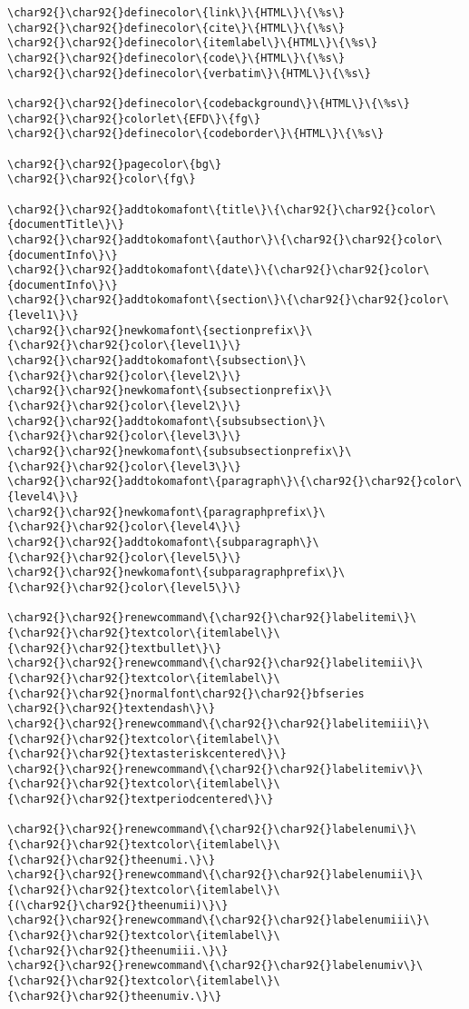 \documentclass{scrartcl}
\begin{document}
\begin{enumerate}
\begin{Code}
\begin{Verbatim}[]
\char92{}\char92{}definecolor\{link\}\{HTML\}\{\%s\}
\char92{}\char92{}definecolor\{cite\}\{HTML\}\{\%s\}
\char92{}\char92{}definecolor\{itemlabel\}\{HTML\}\{\%s\}
\char92{}\char92{}definecolor\{code\}\{HTML\}\{\%s\}
\char92{}\char92{}definecolor\{verbatim\}\{HTML\}\{\%s\}

\char92{}\char92{}definecolor\{codebackground\}\{HTML\}\{\%s\}
\char92{}\char92{}colorlet\{EFD\}\{fg\}
\char92{}\char92{}definecolor\{codeborder\}\{HTML\}\{\%s\}

\char92{}\char92{}pagecolor\{bg\}
\char92{}\char92{}color\{fg\}

\char92{}\char92{}addtokomafont\{title\}\{\char92{}\char92{}color\{documentTitle\}\}
\char92{}\char92{}addtokomafont\{author\}\{\char92{}\char92{}color\{documentInfo\}\}
\char92{}\char92{}addtokomafont\{date\}\{\char92{}\char92{}color\{documentInfo\}\}
\char92{}\char92{}addtokomafont\{section\}\{\char92{}\char92{}color\{level1\}\}
\char92{}\char92{}newkomafont\{sectionprefix\}\{\char92{}\char92{}color\{level1\}\}
\char92{}\char92{}addtokomafont\{subsection\}\{\char92{}\char92{}color\{level2\}\}
\char92{}\char92{}newkomafont\{subsectionprefix\}\{\char92{}\char92{}color\{level2\}\}
\char92{}\char92{}addtokomafont\{subsubsection\}\{\char92{}\char92{}color\{level3\}\}
\char92{}\char92{}newkomafont\{subsubsectionprefix\}\{\char92{}\char92{}color\{level3\}\}
\char92{}\char92{}addtokomafont\{paragraph\}\{\char92{}\char92{}color\{level4\}\}
\char92{}\char92{}newkomafont\{paragraphprefix\}\{\char92{}\char92{}color\{level4\}\}
\char92{}\char92{}addtokomafont\{subparagraph\}\{\char92{}\char92{}color\{level5\}\}
\char92{}\char92{}newkomafont\{subparagraphprefix\}\{\char92{}\char92{}color\{level5\}\}

\char92{}\char92{}renewcommand\{\char92{}\char92{}labelitemi\}\{\char92{}\char92{}textcolor\{itemlabel\}\{\char92{}\char92{}textbullet\}\}
\char92{}\char92{}renewcommand\{\char92{}\char92{}labelitemii\}\{\char92{}\char92{}textcolor\{itemlabel\}\{\char92{}\char92{}normalfont\char92{}\char92{}bfseries \char92{}\char92{}textendash\}\}
\char92{}\char92{}renewcommand\{\char92{}\char92{}labelitemiii\}\{\char92{}\char92{}textcolor\{itemlabel\}\{\char92{}\char92{}textasteriskcentered\}\}
\char92{}\char92{}renewcommand\{\char92{}\char92{}labelitemiv\}\{\char92{}\char92{}textcolor\{itemlabel\}\{\char92{}\char92{}textperiodcentered\}\}

\char92{}\char92{}renewcommand\{\char92{}\char92{}labelenumi\}\{\char92{}\char92{}textcolor\{itemlabel\}\{\char92{}\char92{}theenumi.\}\}
\char92{}\char92{}renewcommand\{\char92{}\char92{}labelenumii\}\{\char92{}\char92{}textcolor\{itemlabel\}\{(\char92{}\char92{}theenumii)\}\}
\char92{}\char92{}renewcommand\{\char92{}\char92{}labelenumiii\}\{\char92{}\char92{}textcolor\{itemlabel\}\{\char92{}\char92{}theenumiii.\}\}
\char92{}\char92{}renewcommand\{\char92{}\char92{}labelenumiv\}\{\char92{}\char92{}textcolor\{itemlabel\}\{\char92{}\char92{}theenumiv.\}\}


\end{Verbatim}
\end{Code}
\end{enumerate}
\end{document}
